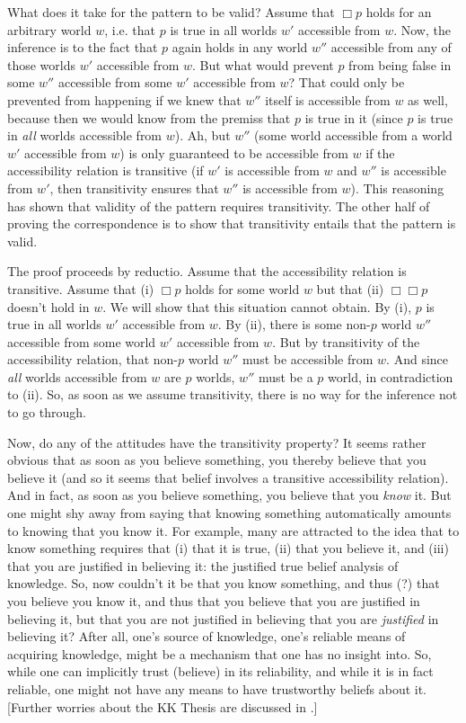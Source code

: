 %
What does it take for the pattern to be valid? Assume that $\Box p$
holds for an arbitrary world $w$, i.e. that $p$ is true in all worlds $w'$
accessible from $w$. Now, the inference is to the fact that $p$ again holds in
any world $w''$ accessible from any of those worlds $w'$ accessible from $w$.
But what would prevent $p$ from being false in some $w''$ accessible from some
$w'$ accessible from $w$? That could only be prevented from happening if we knew
that $w''$ itself is accessible from $w$ as well, because then we would know
from the premiss that $p$ is true in it (since $p$ is true in \emph{all} worlds
accessible from $w$). Ah, but $w''$ (some world accessible from a world $w'$
accessible from $w$) is only guaranteed to be accessible from $w$ if the
accessibility relation is transitive (if $w'$ is accessible from $w$ and $w''$
is accessible from $w'$, then transitivity ensures that $w''$ is accessible from
$w$). This reasoning has shown that validity of the pattern requires
transitivity. The other half of proving the correspondence is to show that
transitivity entails that the pattern is valid.

The proof proceeds by reductio. Assume that the accessibility relation is
transitive. Assume that (i) $\Box p$ holds for some world $w$ but that (ii)
$\Box \Box p$ doesn't hold in $w$. We will show that this situation cannot
obtain. By (i), $p$ is true in all worlds $w'$ accessible from $w$. By (ii),
there is some non-$p$ world $w''$ accessible from some world $w'$ accessible
from $w$. But by transitivity of the accessibility relation, that non-$p$ world
$w''$ must be accessible from $w$. And since \emph{all} worlds accessible from
$w$ are $p$ worlds, $w''$ must be a $p$ world, in contradiction to (ii). So, as
soon as we assume transitivity, there is no way for the inference not to go
through.

Now, do any of the attitudes have the transitivity property? It seems rather
obvious that as soon as you believe something, you thereby believe that you
believe it (and so it seems that belief involves a transitive accessibility
relation). And in fact, as soon as you believe something, you believe that you
\emph{know} it. But one might shy away from saying that knowing something
automatically amounts to knowing that you know it. For example, many are
attracted to the idea that to know something requires that (i) that it is true,
(ii) that you believe it, and (iii) that you are justified in believing it: the
justified true belief analysis of knowledge. So, now couldn't it be that you
know something, and thus (?) that you believe you know it, and thus that you
believe that you are justified in believing it, but that you are not justified
in believing that you are \emph{justified} in believing it? After all, one's
source of knowledge, one's reliable means of acquiring knowledge, might be a
mechanism that one has no insight into. So, while one can implicitly trust
(believe) in its reliability, and while it is in fact reliable, one might not
have any means to have trustworthy beliefs about it. [Further worries about the
KK Thesis are discussed in \cite{williamson-2000-limits}.]

